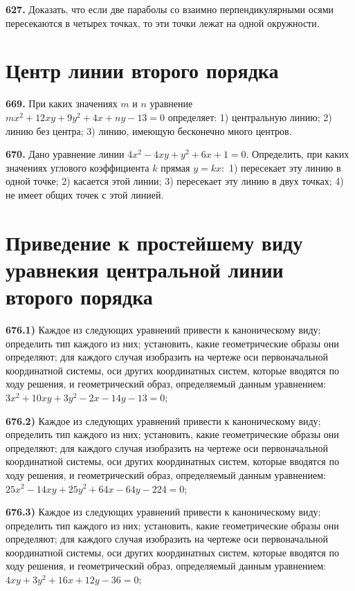 \textbf{627.} Доказать, что если две параболы со взаимно перпендикулярными осями пересекаются в четырех точках, то эти точки лежат на одной окружности.



\section{ Центр линии второго порядка }



\textbf{669.} При каких значениях $m$ и $n$ уравнение $m x^2+12 x y+9 y^2+4 x+n y-13=0$ определяет: 1) центральную линию; 2) линию без центра; 3) линию, имеющую бесконечно много центров.

\textbf{670.} Дано уравнение линии $4 x^2-4 x y+y^2+6 x+1=0$. Определить, при каких значениях углового коэффициента $k$ прямая $y=k x:$ 1) пересекает эту линию в одной точке; 2) касается этой линии; 3) пересекает эту линию в двух точках; 4) не имеет общих точек с этой линией.



\section{Приведение к простейшему виду уравнекия центральной линии второго порядка}



\textbf{676.1)} Каждое из следующих уравнений привести к каноническому виду; определить тип каждого из них; установить, какие геометрические образы они определяют; для каждого случая изобразить на чертеже оси первоначальной координатной системы, оси других координатных систем, которые вводятся по ходу решения, и геометрический образ, определяемый данным уравнением: $3 x^2+10 x y+3 y^2-2 x-14 y-13=0$;

\textbf{676.2)} Каждое из следующих уравнений привести к каноническому виду; определить тип каждого из них; установить, какие геометрические образы они определяют; для каждого случая изобразить на чертеже оси первоначальной координатной системы, оси других координатных систем, которые вводятся по ходу решения, и геометрический образ, определяемый данным уравнением: $25 x^2-14 x y+25 y^2+64 x-64 y-224=0$;

\textbf{676.3)} Каждое из следующих уравнений привести к каноническому виду; определить тип каждого из них; установить, какие геометрические образы они определяют; для каждого случая изобразить на чертеже оси первоначальной координатной системы, оси других координатных систем, которые вводятся по ходу решения, и геометрический образ, определяемый данным уравнением: $4 x y+3 y^2+16 x+12 y-36=0$;

